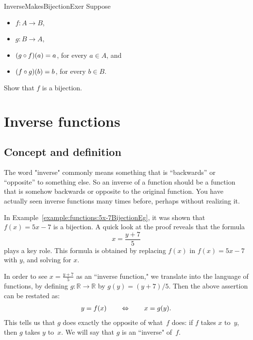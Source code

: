  

 \begin{exercise}{InverseMakesBijectionExer}
 Suppose 
 \begin{itemize}
 \item $f \colon A \to B$,
 \item  $g \colon B \to A$,
 \item $(g \circ f)(a) = a$, for every $a \in A$,
 and
 \item $(f \circ g)(b) = b$, for every $b \in B$.
 \end{itemize}
 Show that $f$ is a bijection.
 \end{exercise}
  
 
 \section{Inverse functions}

\subsection{Concept and definition}

The word "inverse" commonly means something that is ``backwards'' or ``opposite'' to something else.  So an inverse of a function should be  a function that is somehow backwards or opposite to the original  function.  
You have actually seen inverse functions many times before, perhaps without realizing it.

\begin{example}{}
In Example~\ref{example:functions:5x-7BijectionEg}, it was shown that $f(x) = 5x - 7$ is a bijection. A quick look at the proof reveals that the formula
$$x =  \frac{y+7}{5} $$
plays a key role.  This formula is obtained by replacing $f(x)$ in $f(x) = 5x - 7$ with $y$, and solving for $x$.

In order to see $x = \frac{y+7}{5}$ as an ``inverse function," we translate into the language of functions, by defining $g \colon \mathbb{R} \to \mathbb{R}$  by $g(y) = (y+7)/5$. Then the above assertion can be restated as:
\begin{align*} \label{y=f(x)<>x=g(y)}
 y = f(x) \qquad \Leftrightarrow \qquad x = g(y) .
 \end{align*}
This tells us that $g$ does exactly the opposite of what~$f$ does: if $f$ takes $x$ to~$y$, then $g$ takes $y$ to~$x$. We will say that $g$ is an ``inverse" of~$f$.
\end{example}


